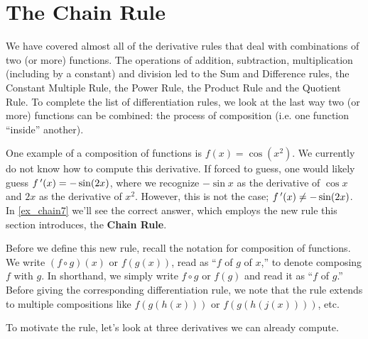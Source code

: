 \section{The Chain Rule}\label{sec:chainrule}

We have covered almost all of the derivative rules that deal with combinations of two (or more) functions.  The operations of addition, subtraction, multiplication (including by a constant) and division led to the Sum and Difference rules, the Constant Multiple Rule, the Power Rule, the Product Rule and the Quotient Rule.  %
To complete the list of differentiation rules, we look at the last way two (or more) functions can be combined: the process of composition (i.e. one function ``inside''  another).

One example of a composition of functions is $f(x) = \cos(x^2)$. We currently do not know how to compute this derivative. If forced to guess, one would likely guess $f\,'(x) = -\sin(2x)$, where we recognize $-\sin x$ as the derivative of $\cos x$ and $2x$ as the derivative of $x^2$. However, this is not the case; $f\,'(x)\neq -\sin(2x)$. In \autoref{ex_chain7} we'll see the correct answer, which employs the new rule this section introduces, the \textbf{Chain Rule}. 

Before we define this new rule, recall the notation for composition of functions. We write $(f \circ g)(x)$ or $f(g(x))$, read as ``$f$ of $g$ of $x$,'' to denote composing $f$ with $g$.  In shorthand, we simply write
$f \circ g$ or $f(g)$ and read it as ``$f$ of $g$.''  Before giving the corresponding differentiation rule, we note that the rule extends to multiple compositions like $f(g(h(x)))$ or $f(g(h(j(x))))$, etc.

To motivate the rule, let's look at three derivatives we can already compute.

